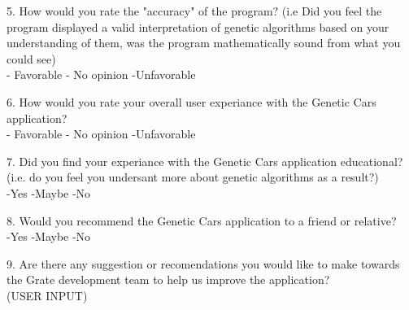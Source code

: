\documentclass[12pt, titlepage]{article}
\begin{document}
5. How would you rate the "accuracy" of the program? (i.e Did you feel the program displayed a valid interpretation of genetic algorithms based on your understanding of them, was the program mathematically sound from what you could see)\\
- Favorable
- No opinion
-Unfavorable

6. How would you rate your overall user experiance with the Genetic Cars application?\\
- Favorable
- No opinion
-Unfavorable

7. Did you find your experiance with the Genetic Cars application educational? (i.e. do you feel you undersant more about genetic algorithms as a result?)\\
-Yes
-Maybe
-No

8. Would you recommend the Genetic Cars application to a friend or relative?\\
-Yes
-Maybe
-No

9. Are there any suggestion or recomendations you would like to make towards the Grate development team to help us improve the application?\\
(USER INPUT)
\end{document}
